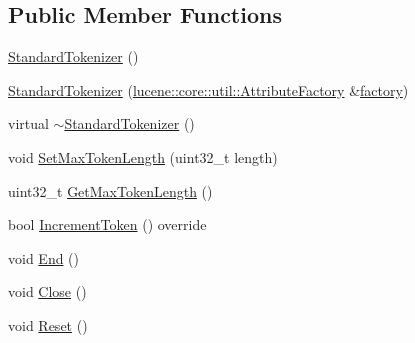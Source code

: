 \subsection*{Public Member Functions}
\begin{DoxyCompactItemize}
\item 
\mbox{\hyperlink{classlucene_1_1core_1_1analysis_1_1standard_1_1StandardTokenizer_a1277d4a3ee7fd0191250c6871c2a4b87}{Standard\+Tokenizer}} ()
\item 
\mbox{\hyperlink{classlucene_1_1core_1_1analysis_1_1standard_1_1StandardTokenizer_ae0953014758400fc119c58373937abc0}{Standard\+Tokenizer}} (\mbox{\hyperlink{classlucene_1_1core_1_1util_1_1AttributeFactory}{lucene\+::core\+::util\+::\+Attribute\+Factory}} \&\mbox{\hyperlink{classlucene_1_1core_1_1util_1_1AttributeSource_a1376420a752f337a0fdb582bdf160eba}{factory}})
\item 
virtual \mbox{\hyperlink{classlucene_1_1core_1_1analysis_1_1standard_1_1StandardTokenizer_af5cadb92a403f1c41592a1be796eeb8b}{$\sim$\+Standard\+Tokenizer}} ()
\item 
void \mbox{\hyperlink{classlucene_1_1core_1_1analysis_1_1standard_1_1StandardTokenizer_ab5b2f4a086ed9ef0f196080fa7de0ceb}{Set\+Max\+Token\+Length}} (uint32\+\_\+t length)
\item 
uint32\+\_\+t \mbox{\hyperlink{classlucene_1_1core_1_1analysis_1_1standard_1_1StandardTokenizer_a8c4763c6470ab3724cd8f05191be48a2}{Get\+Max\+Token\+Length}} ()
\item 
bool \mbox{\hyperlink{classlucene_1_1core_1_1analysis_1_1standard_1_1StandardTokenizer_a5702119d01489ede9396db0794a98c41}{Increment\+Token}} () override
\item 
void \mbox{\hyperlink{classlucene_1_1core_1_1analysis_1_1standard_1_1StandardTokenizer_a733b678af865ff10e41fba9b74131872}{End}} ()
\item 
void \mbox{\hyperlink{classlucene_1_1core_1_1analysis_1_1standard_1_1StandardTokenizer_a108793659fb18bdd695e0c2be91ba730}{Close}} ()
\item 
void \mbox{\hyperlink{classlucene_1_1core_1_1analysis_1_1standard_1_1StandardTokenizer_a4d6e42ca0fcaf07cb6615643362891b3}{Reset}} ()
\end{DoxyCompactItemize}
